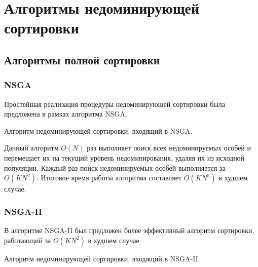 \section{Алгоритмы недоминирующей сортировки}
\subsection{Алгоритмы полной сортировки}
\subsubsection{NSGA}
Простейшая реализация процедуры недоминирующей сортировки была предложена в рамках алгоритма NSGA.
\cite{nsga1}
\begin{algorithm}[H]
\begin{algorithmic}[1]
				\EndIf
			\EndFor
			\EndIf
		\EndFor
	\EndWhile
\EndProcedure
\end{algorithmic}
\caption{Алгоритм недоминирующей сортировки, входящий в NSGA.}
\label{NDS_NSGA}
\end{algorithm}
Данный алгоритм $O(N)$ раз выполняет поиск всех недоминируемых особей и перемещает 
их на текущий уровень недоминирования, удаляя их из исходной популяции.
Каждый раз поиск недоминируемых особей выполняется за $O(KN^2)$. Итоговое время работы алгоритма
составляет $O(KN^3)$ в худшем случае. \cite{deb_nsga2}

\subsubsection{NSGA-II}
В алгоритме NSGA-II был предложен более эффективный алгоритм сортировки, работающий за $O(KN^2)$
в худшем случае.\cite{deb_nsga2}
\begin{algorithm}[H]
\begin{algorithmic}[1]
			\EndIf
		\EndFor
		\EndIf
	\EndFor
				\EndIf
			\EndFor
		\EndFor
	\EndWhile
\EndProcedure
\end{algorithmic}
\caption{Алгоритм недоминирующей сортировки, входящий в NSGA-II.}
\label{NDS_NSGA2}
\end{algorithm}

